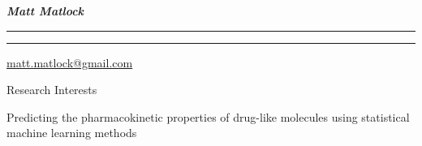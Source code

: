 \documentclass[10pt]{article}
\begin{document}
\settowidth{\cvlabelwidth}{%
\cvlabelfont 2009-2009%
}%
\begin{cv}{\huge \it \bfseries Matt Matlock}
\vskip3pt
\hrule\hrule
\vskip3pt
\hfill \url{matt.matlock@gmail.com}

{
\setlength{\cvlabelsep}{0mm}
\setlength{\cvlabelwidth}{0mm}
\begin{cvlist}{Research Interests}
\item Predicting the pharmacokinetic properties of drug-like molecules using statistical machine learning methods
\end{cvlist}
}




\end{cv}
\end{document}

